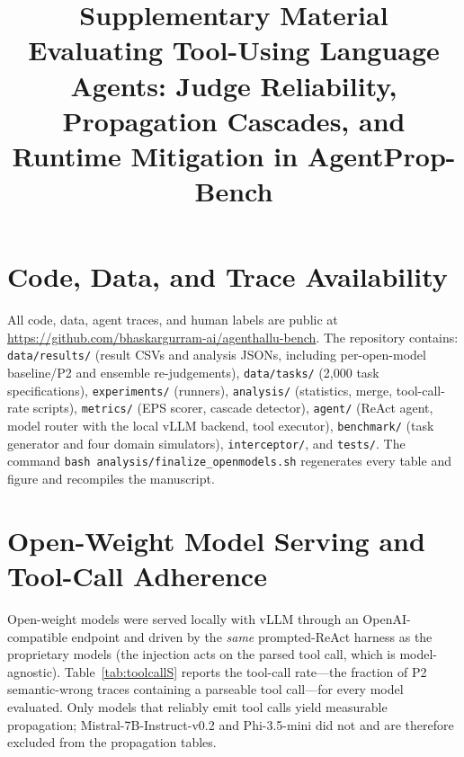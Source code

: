 \documentclass[11pt]{article}
\title{Supplementary Material\\[0.4em]
\large Evaluating Tool-Using Language Agents: Judge Reliability,
Propagation Cascades, and Runtime Mitigation in AgentProp-Bench}
\date{}
\begin{document}
\maketitle
\tableofcontents
\newpage

\section{Code, Data, and Trace Availability}
All code, data, agent traces, and human labels are public at
\url{https://github.com/bhaskargurram-ai/agenthallu-bench}.
The repository contains: \texttt{data/results/} (result CSVs and analysis
JSONs, including per-open-model baseline/P2 and ensemble re-judgements),
\texttt{data/tasks/} (2{,}000 task specifications), \texttt{experiments/}
(runners), \texttt{analysis/} (statistics, merge, tool-call-rate scripts),
\texttt{metrics/} (EPS scorer, cascade detector), \texttt{agent/} (ReAct agent,
model router with the local vLLM backend, tool executor),
\texttt{benchmark/} (task generator and four domain simulators),
\texttt{interceptor/}, and \texttt{tests/}. The command
\texttt{bash analysis/finalize\_openmodels.sh} regenerates every table and
figure and recompiles the manuscript.

\section{Open-Weight Model Serving and Tool-Call Adherence}
Open-weight models were served locally with vLLM through an OpenAI-compatible
endpoint and driven by the \emph{same} prompted-ReAct harness as the
proprietary models (the injection acts on the parsed tool call, which is
model-agnostic). Table~\ref{tab:toolcallS} reports the tool-call rate---the
fraction of P2 semantic-wrong traces containing a parseable tool call---for
every model evaluated. Only models that reliably emit tool calls yield
measurable propagation; Mistral-7B-Instruct-v0.2 and Phi-3.5-mini did not and
are therefore excluded from the propagation tables.
\end{document}
